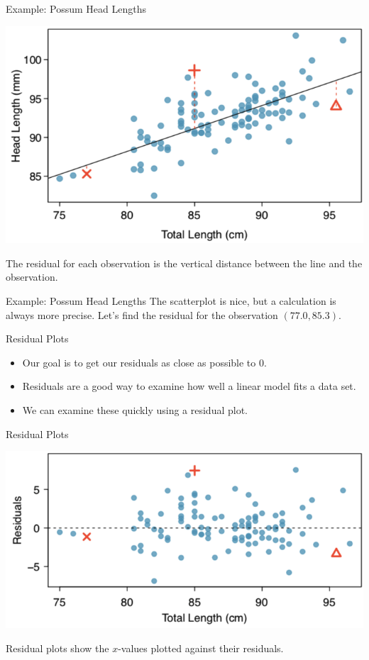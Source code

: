 \begin{frame}{Example: Possum Head Lengths}
    \begin{center}
        \includegraphics[scale=0.3]{images/possreg.png}
    \end{center}
    The residual for each observation is the vertical distance between the line and the observation. 
\end{frame}

\begin{frame}{Example: Possum Head Lengths}
    The scatterplot is nice, but a calculation is always more precise. Let's find the residual for the observation $(77.0, 85.3)$.
\end{frame}

\begin{frame}{Residual Plots}
    \begin{itemize}
        \item Our goal is to get our residuals as close as possible to 0.
        \item Residuals are a good way to examine how well a linear model fits a data set.
        \item We can examine these quickly using a residual plot.
    \end{itemize}
\end{frame}

\begin{frame}{Residual Plots}
    \begin{center}
        \includegraphics[scale=0.4]{images/resid.png}
    \end{center}
    Residual plots show the $x$-values plotted against their residuals.
\end{frame}

